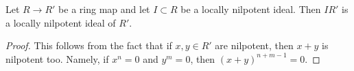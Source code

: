 \begin{lemma}
\label{lemma-locally-nilpotent}
Let $R \to R'$ be a ring map and let $I \subset R$ be a locally nilpotent
ideal. Then $IR'$ is a locally nilpotent ideal of $R'$.
\end{lemma}

\begin{proof}
This follows from the fact that if $x, y \in R'$ are nilpotent, then
$x + y$ is nilpotent too. Namely, if $x^n = 0$ and $y^m = 0$, then
$(x + y)^{n + m - 1} = 0$.
\end{proof}